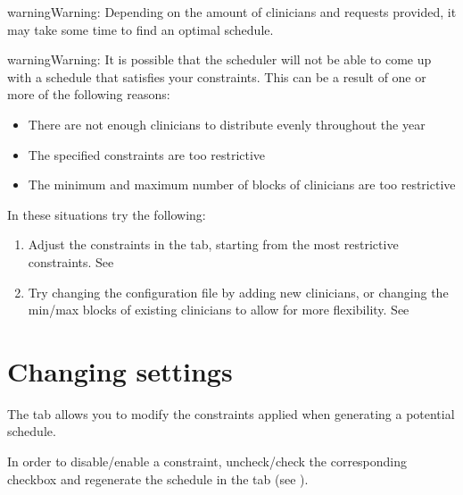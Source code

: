 \documentclass[letterpaper,10pt,english]{sphinxmanual}
\begin{document}
\begin{sphinxadmonition}{warning}{Warning:}
Depending on the amount of clinicians and requests provided, it may take
some time to find an optimal schedule.
\end{sphinxadmonition}

\begin{sphinxadmonition}{warning}{Warning:}
It is possible that the scheduler will not be able to come up with a
schedule that satisfies your constraints. This can be a result of one
or more of the following reasons:
\begin{itemize}
\item {} 
There are not enough clinicians to distribute evenly throughout the year

\item {} 
The specified constraints are too restrictive

\item {} 
The minimum and maximum number of blocks of clinicians are too restrictive

\end{itemize}

In these situations try the following:
\begin{enumerate}
%
\item {} 
Adjust the constraints in the  tab, starting from the
most restrictive constraints. See {\hyperref[\detokenize{manual:changing-settings}]{}}

\item {} 
Try changing the configuration file by adding new clinicians, or
changing the min/max blocks of existing clinicians to allow for
more flexibility. See {\hyperref[\detokenize{manual:clinician-configuration}]{}}

\end{enumerate}
\end{sphinxadmonition}


\section{Changing settings}
\label{\detokenize{manual:changing-settings}}\label{\detokenize{manual:id4}}
The  tab allows you to modify the constraints applied when
generating a potential schedule.

In order to disable/enable a constraint, uncheck/check the
corresponding checkbox and re\sphinxhyphen{}generate the schedule in the 
tab (see {\hyperref[\detokenize{manual:generating-a-schedule}]{}}).
\end{document}
